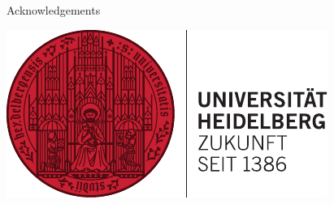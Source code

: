 \documentclass[final]{beamer}
\newlength{\onecolwid}
\begin{document}
\begin{frame}[t]
\begin{columns}[t]
\begin{column}{\onecolwid}
\begin{block}{Acknowledgements}

\end{block}



\begin{flushright}
\includegraphics[width=0.5\linewidth]{logo_hd.pdf}
\end{flushright}


\end{column} %

\end{columns} %

\end{frame} %
\end{document}
